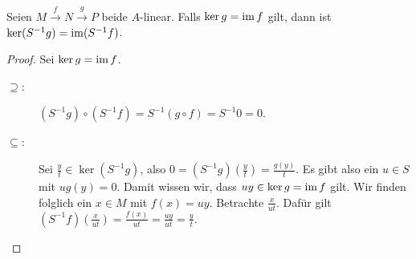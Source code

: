 \documentclass[12pt,a4paper]{scrartcl}
\theoremstyle{cplain}
\theoremstyle{cdef}
\begin{document}
\begin{satz}
	Seien $M\xrightarrow{f}N\xrightarrow{g}P$ beide $A$-linear. Falls $\operatorname{ker} g = \operatorname{im} f$ gilt, dann ist $\operatorname{ker}(S^{-1}g) = \operatorname{im} (S^{-1}f)$.
\end{satz}
\begin{proof}
	Sei $\operatorname{ker} g = \operatorname{im} f$.
	\begin{description}
		\item[\glqq$\supseteq$\grqq:] $(S^{-1}g)\circ(S^{-1}f) = S^{-1}(g\circ f) = S^{-1}0 = 0$.
		\item[\glqq$\subseteq$\grqq:] Sei $\frac yt\in \ker(S^{-1}g)$, also $0 = (S^{-1}g)\left(\frac yt\right) = \frac{g(y)}t$. Es gibt also ein $u\in S$ mit $ug(y) = 0$. Damit wissen wir, dass $uy\in\operatorname{ker} g = \operatorname{im} f$ gilt. Wir finden folglich ein $x\in M$ mit $f(x) = uy$. Betrachte $\frac x{ut}$. Dafür gilt $(S^{-1}f)\left(\frac x{ut}\right) = \frac{f(x)}{ut} = \frac{uy}{ut} = \frac yt$.
		\qedhere
	\end{description}
\end{proof}
\end{document}
